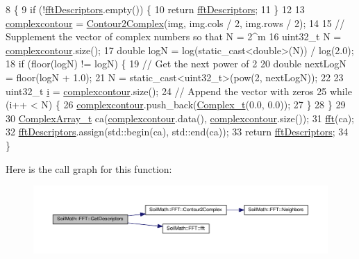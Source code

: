 \begin{DoxyCode}
8                                                   \{
9   \textcolor{keywordflow}{if} (!\hyperlink{class_soil_math_1_1_f_f_t_a466b360529319d0e6e3220f446f703be}{fftDescriptors}.empty()) \{
10     \textcolor{keywordflow}{return} \hyperlink{class_soil_math_1_1_f_f_t_a466b360529319d0e6e3220f446f703be}{fftDescriptors};
11   \}
12 
13   \hyperlink{class_soil_math_1_1_f_f_t_a48141f0c777ca86f2e536f88b509b639}{complexcontour} = \hyperlink{class_soil_math_1_1_f_f_t_a18a95490ea8e929584c2af6569dec3b6}{Contour2Complex}(img, img.cols / 2, img.rows / 2);
14 
15   \textcolor{comment}{// Supplement the vector of complex numbers so that N = 2^m}
16   uint32\_t N = \hyperlink{class_soil_math_1_1_f_f_t_a48141f0c777ca86f2e536f88b509b639}{complexcontour}.size();
17   \textcolor{keywordtype}{double} logN = log(static\_cast<double>(N)) / log(2.0);
18   \textcolor{keywordflow}{if} (floor(logN) != logN) \{
19     \textcolor{comment}{// Get the next power of 2}
20     \textcolor{keywordtype}{double} nextLogN = floor(logN + 1.0);
21     N = \textcolor{keyword}{static\_cast<}uint32\_t\textcolor{keyword}{>}(pow(2, nextLogN));
22 
23     uint32\_t \hyperlink{_comparision_pictures_2_createtest_image_8m_a6f6ccfcf58b31cb6412107d9d5281426}{i} = \hyperlink{class_soil_math_1_1_f_f_t_a48141f0c777ca86f2e536f88b509b639}{complexcontour}.size();
24     \textcolor{comment}{// Append the vector with zeros}
25     \textcolor{keywordflow}{while} (i++ < N) \{
26       \hyperlink{class_soil_math_1_1_f_f_t_a48141f0c777ca86f2e536f88b509b639}{complexcontour}.push\_back(\hyperlink{_soil_math_types_8h_a26c307796ad803485b0376c90026d8f7}{Complex\_t}(0.0, 0.0));
27     \}
28   \}
29 
30   \hyperlink{_soil_math_types_8h_a5118c9f6b02a06945c93a3893e51febe}{ComplexArray\_t} ca(\hyperlink{class_soil_math_1_1_f_f_t_a48141f0c777ca86f2e536f88b509b639}{complexcontour}.data(), 
      \hyperlink{class_soil_math_1_1_f_f_t_a48141f0c777ca86f2e536f88b509b639}{complexcontour}.size());
31   \hyperlink{class_soil_math_1_1_f_f_t_a48bc7ad948d820d6f87b3e353b6d1cd4}{fft}(ca);
32   \hyperlink{class_soil_math_1_1_f_f_t_a466b360529319d0e6e3220f446f703be}{fftDescriptors}.assign(std::begin(ca), std::end(ca));
33   \textcolor{keywordflow}{return} \hyperlink{class_soil_math_1_1_f_f_t_a466b360529319d0e6e3220f446f703be}{fftDescriptors};
34 \}
\end{DoxyCode}


Here is the call graph for this function\+:\nopagebreak
\begin{figure}[H]
\begin{center}
\leavevmode
\includegraphics[width=350pt]{class_soil_math_1_1_f_f_t_af5fb6f4804079ee184a314e2f0a0f2fc_cgraph}
\end{center}
\end{figure}




